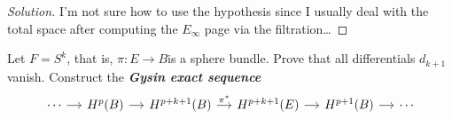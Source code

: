 \begin{proof}[Solution]\leavevmode
	I'm not sure how to use the hypothesis since I usually deal with the total space after computing the $E_\infty$ page via the filtration…
\end{proof}

\begin{manualexercise}{2.8}
	Let $F=S^k$, that is, $\pi:E\to B$is a sphere bundle. Prove that all differentials $d_{k+1}$ vanish. Construct the \textit{\textbf{Gysin exact sequence}} 
	\[\begin{tikzcd}[column sep=small]
		\cdots\arrow[r]&H^{p}(B)\arrow[r]&H^{p+k+1}(B)\arrow[r,"\pi^*"]&H^{p+k+1}(E)\arrow[r]&H^{p+1}(B)\arrow[r]&\cdots
	\end{tikzcd}\]
\end{manualexercise}

